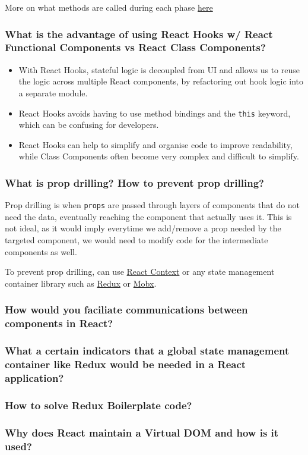 \documentclass[12pt, a4paper]{article}
\newcommand{\code}[1]{\texttt{#1}}
\begin{document}
More on what methods are called during each phase \href{https://www.w3schools.com/react/react_lifecycle.asp}{here}

\subsubsection*{What is the advantage of using React Hooks w/ React Functional Components vs React Class Components?}
\begin{itemize}
  \item With React Hooks, stateful logic is decoupled from UI and allows us to reuse the logic across multiple React components, by refactoring out hook logic into a separate module.
  \item React Hooks avoids having to use method bindings and the \code{this} keyword, which can be confusing for developers.
  \item React Hooks can help to simplify and organise code to improve readability, while Class Components often become very complex and difficult to simplify.
\end{itemize}

\subsubsection*{What is prop drilling? How to prevent prop drilling?}
Prop drilling is when \code{props} are passed through layers of components that do not need the data, eventually reaching the component that actually uses it.
This is not ideal, as it would imply everytime we add/remove a prop needed by the targeted component, we would need to modify code for the intermediate components as well.

To prevent prop drilling, can use \href{https://reactjs.org/docs/context.html}{React Context} or any state management container library such as \href{https://redux.js.org/introduction/getting-started}{Redux} or \href{https://mobx.js.org/README.html}{Mobx}.

\subsubsection*{How would you faciliate communications between components in React?}

\subsubsection*{What a certain indicators that a global state management container like Redux would be needed in a React application?}
\subsubsection*{How to solve Redux Boilerplate code?}
\subsubsection*{Why does React maintain a Virtual DOM and how is it used?}
\end{document}
